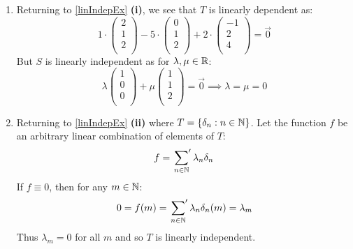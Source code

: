 \documentclass[../main.tex]{subfiles}
\begin{document}
\begin{example}
  \begin{enumerate}
    \item Returning to \cref{linIndepEx} \textbf{(i)}, we see that $T$ is linearly dependent as:
      \[
        1 \cdot \begin{pmatrix}
        2 \\
        1 \\
        2 \\
        \end{pmatrix} - 5 \cdot \begin{pmatrix}
        0 \\
        1 \\
        2 \\
        \end{pmatrix} + 2 \cdot \begin{pmatrix}
        -1 \\
        2 \\
        4 \\
        \end{pmatrix} = \vec{0}
      \]
      But $S$ is linearly independent as for $\lambda, \mu \in \mathbb{R}$:
      \[
        \lambda \begin{pmatrix}
        1 \\
        0 \\
        0 \\
        \end{pmatrix} + \mu \begin{pmatrix}
        1 \\
        1 \\
        2 \\
        \end{pmatrix} = \vec{0} \implies \lambda = \mu = 0
      \]
    \item Returning to \cref{linIndepEx} \textbf{(ii)} where $T = \{\delta_n: n \in \mathbb{N}\}$.
      Let the function $f$ be an arbitrary linear combination of elements of $T$:
      \[
        f = \sideset{}{'}\sum_{n \in \mathbb{N}} \lambda_n \delta_n
      \]
      If $f \equiv 0$, then for any $m \in \mathbb{N}$:
      \[
        0 = f(m) = \sideset{}{'}\sum_{n \in \mathbb{N}} \lambda_n \delta_n(m) = \lambda_m
      \]
      Thus $\lambda_m = 0$ for all $m$ and so $T$ is linearly independent.
  \end{enumerate}
\end{example}
\end{document}
